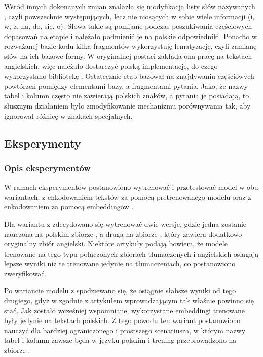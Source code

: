 Wśród innych dokonanych zmian znalazła się modyfikacja listy słów nazywanych , czyli powszechnie występujących, lecz nie niosących w sobie wiele informacji (i, w, z, na, do, się, o). Słowa takie są pomijane podczas poszukiwania częściowych dopasowań na etapie  i należało podmienić je na polskie odpowiedniki. Ponadto w rozważanej bazie kodu kilka fragmentów wykorzystuję lematyzację, czyli zamianę słów na ich bazowe formy. W oryginalnej postaci zakłada ona pracę na tekstach angielskich, więc należało dostarczyć polską implementację, do czego wykorzystano bibliotekę . Ostatecznie etap  bazował na znajdywaniu częściowych powtórzeń pomiędzy elementami bazy, a fragmentami pytania. Jako, że nazwy tabel i kolumn często nie zawierają polskich znaków, a pytania je posiadają, to słusznym działaniem było zmodyfikowanie mechanizmu porównywania tak, aby ignorował różnicę w znakach specjalnych.

\subsection{Eksperymenty}

\subsubsection{Opis eksperymentów}
W ramach eksperymentów postanowiono wytrenować i przetestować model  w obu wariantach: z enkodowaniem tekstów za pomocą pretrenowanego modelu  oraz z enkodowaniem za pomocą embeddingów . 

Dla wariantu z  zdecydowano się wytrenować dwie wersje, gdzie jedna zostanie nauczona na polskim zbiorze , a druga na zbiorze , który zawiera dodatkowo oryginalny zbiór angielski. Niektóre artykuły podają bowiem, że modele trenowane na tego typu połączonych zbiorach tłumaczonych i angielskich osiągają lepsze wyniki niż te trenowane jedynie na tłumaczeniach, co postanowiono zweryfikować.

Po wariancie modelu z  spodziewano się, że osiągnie słabsze wyniki od tego drugiego, gdyż w zgodnie z artykułem wprowadzającym  tak właśnie powinno się stać. Jak zostało wcześniej wspomniane, wykorzystane embeddingi  trenowane były jedynie na tekstach polskich. Z tego powodu ten wariant postanowiono nauczyć dla bardziej ograniczonego i prostszego scenariusza, w którym nazwy tabel i kolumn zawsze będą w języku polskim i trening przeprowadzono na zbiorze .

